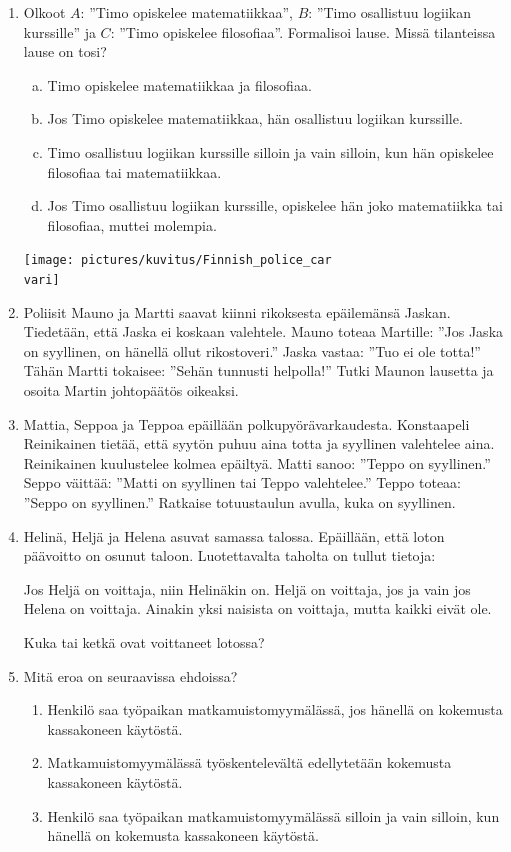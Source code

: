 \begin{enumerate}
\item
Olkoot $A$: ''Timo opiskelee matematiikkaa'', $B$: ''Timo osallistuu logiikan kurssille'' ja $C$: ''Timo opiskelee filosofiaa''. Formalisoi lause. Missä tilanteissa lause on tosi?
\begin{enumerate}[a)]
\item Timo opiskelee matematiikkaa ja filosofiaa.
\item Jos Timo opiskelee matematiikkaa, hän osallistuu logiikan kurssille.
\item Timo osallistuu logiikan kurssille silloin ja vain silloin, kun hän opiskelee filosofiaa tai matematiikkaa.
\item Jos Timo osallistuu logiikan kurssille, opiskelee hän joko matematiikka tai filosofiaa, muttei molempia.
\end{enumerate}

\bigskip

\begin{center}
\texttt{[image: pictures/kuvitus/Finnish\_police\_car\\vari]}
\end{center}

\item Poliisit Mauno ja Martti saavat kiinni rikoksesta epäilemänsä Jaskan. Tiedetään, että Jaska ei koskaan valehtele. Mauno toteaa Martille: ''Jos Jaska on syyllinen, on hänellä ollut rikostoveri.'' Jaska vastaa: ''Tuo ei ole totta!'' Tähän Martti tokaisee: ''Sehän tunnusti helpolla!'' Tutki Maunon lausetta ja osoita Martin johtopäätös oikeaksi.

\item Mattia, Seppoa ja Teppoa epäillään polkupyörävarkaudesta. Konstaapeli Reinikainen tietää, että syytön puhuu aina totta ja syyllinen valehtelee aina. Reinikainen kuulustelee kolmea epäiltyä. Matti sanoo: ''Teppo on syyllinen.'' Seppo väittää: ''Matti on syyllinen tai Teppo valehtelee.'' Teppo toteaa: ''Seppo on syyllinen.'' Ratkaise totuustaulun avulla, kuka on syyllinen. 

\item Helinä, Heljä ja Helena asuvat samassa talossa. Epäillään, että loton päävoitto on osunut taloon. Luotettavalta taholta on tullut tietoja:

Jos Heljä on voittaja, niin Helinäkin on. 
Heljä on voittaja, jos ja vain jos Helena on voittaja.
Ainakin yksi naisista on voittaja, mutta kaikki eivät ole.

Kuka tai ketkä ovat voittaneet lotossa?

\item
Mitä eroa on seuraavissa ehdoissa?
\begin{enumerate}
\item Henkilö saa työpaikan matkamuistomyymälässä, jos hänellä on kokemusta kassakoneen käytöstä.
\item Matkamuistomyymälässä työskentelevältä edellytetään kokemusta kassakoneen käytöstä.
\item 
Henkilö saa työpaikan matkamuistomyymälässä silloin ja vain silloin, kun hänellä on kokemusta kassakoneen käytöstä.
\end{enumerate}



\end{enumerate}
